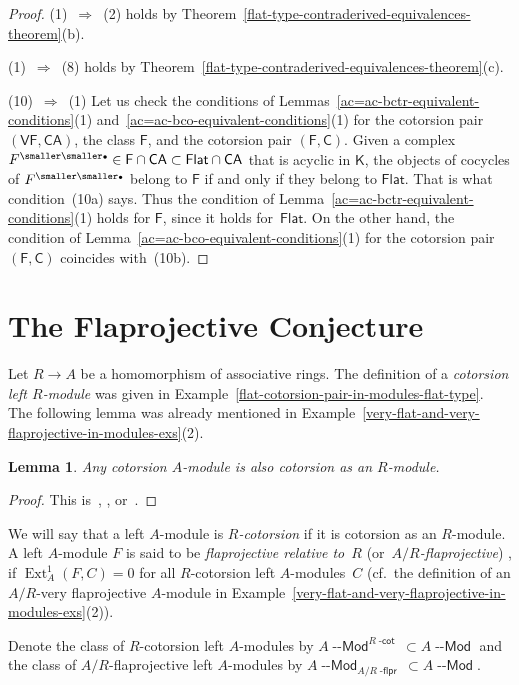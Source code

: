 \documentclass[12pt,a4paper]{amsart}
\newcommand{\+}{\nobreakdash-}
\renewcommand{\:}{\colon}
\newcommand{\rarrow}{\longrightarrow}
\newcommand{\bu}{{\text{\smaller\smaller$\scriptstyle\bullet$}}}
\DeclareMathOperator{\Ext}{Ext}
\newcommand{\Modl}{{\operatorname{\mathsf{--Mod}}}}
\newcommand{\sC}{\mathsf C}
\newcommand{\sF}{\mathsf F}
\newcommand{\sK}{\mathsf K}
\newcommand{\VF}{\mathsf{VF}}
\newcommand{\CA}{\mathsf{CA}}
\newcommand{\Flat}{\mathsf{Flat}}
\newcommand{\dcot}{{\operatorname{\mathsf{-cot}}}}
\newcommand{\dflpr}{{\operatorname{\mathsf{-flpr}}}}
\newcommand{\Section}[1]{\bigskip\section{#1}\medskip}
\theoremstyle{plain}
\newtheorem{lem}[thm]{Lemma}
\theoremstyle{definition}
\begin{document}
\begin{proof}
 (1)~$\Longrightarrow$~(2) holds by
Theorem~\ref{flat-type-contraderived-equivalences-theorem}(b).

 (1)~$\Longrightarrow$~(8) holds by
Theorem~\ref{flat-type-contraderived-equivalences-theorem}(c).

 (10)~$\Longrightarrow$~(1)
 Let us check the conditions of
Lemmas~\ref{ac=ac-bctr-equivalent-conditions}(1)
and~\ref{ac=ac-bco-equivalent-conditions}(1) for the cotorsion pair
$(\VF,\CA)$, the class $\sF$, and the cotorsion pair $(\sF,\sC)$.
 Given a complex $F^\bu\in\sF\cap\CA\subset\Flat\cap\CA$ that is
acyclic in $\sK$, the objects of cocycles of $F^\bu$ belong to
$\sF$ if and only if they belong to $\Flat$.
 That is what condition~(10a) says.
 Thus the condition of Lemma~\ref{ac=ac-bctr-equivalent-conditions}(1)
holds for $\sF$, since it holds for~$\Flat$.
 On the other hand, the condition of
Lemma~\ref{ac=ac-bco-equivalent-conditions}(1) for the cotorsion
pair $(\sF,\sC)$ coincides with~(10b).
\end{proof}


\Section{The Flaprojective Conjecture}

 Let $R\rarrow A$ be a homomorphism of associative rings.
 The definition of a \emph{cotorsion left $R$\+module} was given in
Example~\ref{flat-cotorsion-pair-in-modules-flat-type}.
 The following lemma was already mentioned in
Example~\ref{very-flat-and-very-flaprojective-in-modules-exs}(2).

\begin{lem} \label{restriction-of-scalars-cotorsion}
 Any cotorsion $A$\+module is also cotorsion as an $R$\+module.
\end{lem}

\begin{proof}
 This is~\cite[Lemma~1.3.4(a)]{Pcosh}, \cite[Lemma~1.6(a)]{Pdomc},
or~\cite[Lemma~2.3]{PBas}.
\end{proof}

 We will say that a left $A$\+module is \emph{$R$\+cotorsion} if it is
cotorsion as an $R$\+module.
 A left $A$\+module $F$ is said to be \emph{flaprojective relative
to~$R$} (or~\emph{$A/R$\+flaprojective}) \cite[Section~1.6]{Pdomc},
\cite[Section~3]{PBas} if $\Ext_A^1(F,C)=0$ for all $R$\+cotorsion
left $A$\+modules~$C$ (cf.\ the definition of an $A/R$\+very
flaprojective $A$\+module in
Example~\ref{very-flat-and-very-flaprojective-in-modules-exs}(2)).

 Denote the class of $R$\+cotorsion left $A$\+modules by
$A\Modl^{R\dcot}\subset A\Modl$ and the class of $A/R$\+flaprojective
left $A$\+modules by $A\Modl_{A/R\dflpr}\subset A\Modl$.
\end{document}
